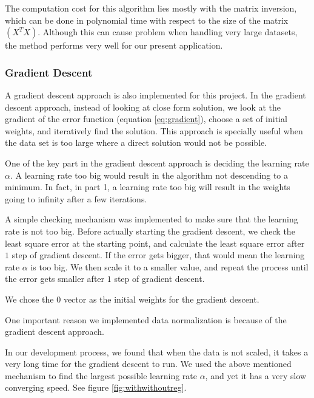 \documentclass[conference,compsoc]{IEEEtran}
\begin{document}
The computation cost for this algorithm lies mostly with the matrix inversion, which can be done in polynomial time with respect to the size of the matrix $(X^TX)$. Although this can cause problem when handling very large datasets, the method performs very well for our present application.

\subsubsection{Gradient Descent}

A gradient descent approach is also implemented for this project. In the gradient descent approach, instead of looking at close form solution, we look at the gradient of the error function (equation \ref{eq:gradient}), choose a set of initial weights, and iteratively find the solution. This approach is specially useful when the data set is too large where a direct solution would not be possible.

One of the key part in the gradient descent approach is deciding the learning rate $\alpha$. A learning rate too big would result in the algorithm not descending to a minimum. In fact, in part 1, a learning rate too big will result in the weights going to infinity after a few iterations.

A simple checking mechanism was implemented to make sure that the learning rate is not too big. Before actually starting the gradient descent, we check the least square error at the starting point, and calculate the least square error after $1$ step of gradient descent. If the error gets bigger, that would mean the learning rate $\alpha$ is too big. We then scale it to a smaller value, and repeat the process until the error gets smaller after $1$ step of gradient descent.

We chose the $0$ vector as the initial weights for the gradient descent.

One important reason we implemented data normalization is because of the gradient descent approach.

In our development process, we found that when the data is not scaled, it takes a very long time for the gradient descent to run. We used the above mentioned mechanism to find the largest possible learning rate $\alpha$, and yet it has a very slow converging speed. See figure \ref{fig:withwithoutreg}.
\end{document}
